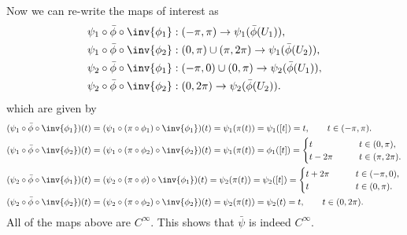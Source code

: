\begin{solution}
\begin{enumerate}[(a)]
		Now we can re-write the maps of interest as
		\begin{align*}
			&\psi_1\circ\bar{\phi}\circ\inv{\phi_1}: (-\pi,\pi)\to \psi_1(\bar{\phi}(U_1)),\\
			&\psi_1\circ\bar{\phi}\circ\inv{\phi_2}:(0,\pi)\cup(\pi,2\pi)\to \psi_1(\bar{\phi}(U_2)),\\
			&\psi_2\circ\bar{\phi}\circ\inv{\phi_1}: (-\pi,0) \cup (0,\pi)\to \psi_2(\bar{\phi}(U_1)),\\
			&\psi_2\circ\bar{\phi}\circ\inv{\phi_2}: (0,2\pi)\to \psi_2(\bar{\phi}(U_2)).
		\end{align*}
		which are given by
		\begin{align*}
			&(\psi_1\circ\bar{\phi}\circ\inv{\phi_1})(t) = (\psi_1\circ(\pi\circ\phi_1)\circ\inv{\phi_1})(t) = \psi_1(\pi(t)) = \psi_1([t]) = t, \qquad t \in (-\pi,\pi).\\
			&(\psi_1\circ\bar{\phi}\circ\inv{\phi_2})(t) = (\psi_1\circ(\pi\circ\phi_2)\circ\inv{\phi_2})(t) = \psi_1(\pi(t)) = \phi_1([t]) = \begin{cases}
				t \qquad & t\in (0,\pi),\\
				t-2\pi \qquad & t\in (\pi,2\pi).
			\end{cases}\\
			&(\psi_2\circ\bar{\phi}\circ\inv{\phi_1})(t) = (\psi_2\circ(\pi\circ\phi)\circ\inv{\phi_1})(t) = \psi_2(\pi(t)) = \psi_2([t]) = \begin{cases}
				t+2\pi \qquad & t \in (-\pi,0),\\
				t \qquad & t\in (0,\pi).
			\end{cases}\\
			&(\psi_2\circ\bar{\phi}\circ\inv{\phi_2})(t) = (\psi_2\circ(\pi\circ\phi_2)\circ\inv{\phi_2})(t) = \psi_2(\pi(t)) = \psi_2(t) = t, \qquad t \in (0,2\pi).
		\end{align*}
		All of the maps above are $ C^\infty $. This shows that $ \bar{\psi} $ is indeed $ C^\infty $.
		

\end{enumerate}
\end{solution}
